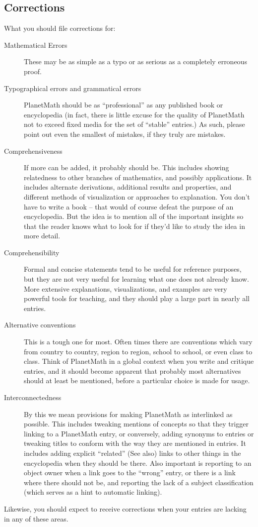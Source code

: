 \subsection{Corrections}
What you should file corrections for:
\begin{description}
\item[Mathematical Errors] These may be as simple as a typo or as
serious as a completely erroneous proof.
\item[Typographical errors and grammatical errors] PlanetMath should
be as ``professional'' as any published book or encyclopedia (in
fact, there is little excuse for the quality of PlanetMath not to
exceed fixed media for the set of ``stable'' entries.) As such,
please point out even the smallest of mistakes, if they truly are
mistakes.
\item[Comprehensiveness] If more can be added, it probably should
be. This includes showing relatedness to other branches of
mathematics, and possibly applications. It includes alternate
derivations, additional results and properties, and different
methods of visualization or approaches to explanation. You don't
have to write a book -- that would of course defeat the purpose of
an encyclopedia. But the idea is to mention all of the important
insights so that the reader knows what to look for if they'd like to
study the idea in more detail.
\item[Comprehensibility] Formal and concise statements tend to be
useful for reference purposes, but they are not very useful for
learning what one does not already know. More extensive
explanations, visualizations, and examples are very powerful tools
for teaching, and they should play a large part in nearly all
entries.
\item[Alternative conventions] This is a tough one for most. Often
times there are conventions which vary from country to country,
region to region, school to school, or even class to class. Think of
PlanetMath in a global context when you write and critique entries,
and it should become apparent that probably most alternatives should
at least be mentioned, before a particular choice is made for usage.
\item[Interconnectedness] By this we mean provisions for making
PlanetMath as interlinked as possible. This includes tweaking
mentions of concepts so that they trigger linking to a PlanetMath
entry, or conversely, adding synonyms to entries or tweaking titles
to conform with the way they are mentioned in entries. It includes
adding explicit ``related'' (See also) links to other things in the
encyclopedia when they should be there. Also important is reporting
to an object owner when a link goes to the ``wrong'' entry, or there
is a link where there should not be, and reporting the lack of a
subject classification (which serves as a hint to automatic
linking).
\end{description}
Likewise, you should expect to receive corrections when your entries
are lacking in any of these areas.


